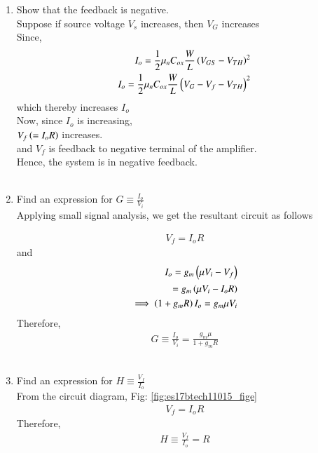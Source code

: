 \begin{enumerate}[label=\arabic*.,ref=\theenumi]
\item Show that the feedback is negative.\\
\solution 
Suppose if source voltage $V_s$ increases, then $V_G$ increases\\
Since,\\
\begin{align}
I_o = \frac{1}{2}\mu_nC_{ox}\frac{W}{L}\left(V_{GS}-V_{TH}\right)^2\\
    I_o = \frac{1}{2}\mu_nC_{ox}\frac{W}{L}\left(V_G-V_f-V_{TH}\right)^2
\end{align}
which thereby increases $I_o$\\

Now, since $I_o$ is increasing, \\
$V_f\left(=I_oR\right)$ increases.\\
and $V_f$ is feedback to negative terminal of the amplifier.\\
Hence, the system is in negative feedback.\\
\\

\item Find an expression for $G \equiv \frac{I_o}{V_i}$\\
\solution  Applying small signal analysis, we get the resultant circuit as follows 
\begin{figure}[ht!]
	\begin{center}
	    \resizebox{\columnwidth/1}{!}{}
	\end{center}
	\caption{}
	\label{fig:es17btech11015_fig2}
\end{figure}
\begin{align}
    V_f = I_oR
\end{align}
and 
\begin{align}
    I_o = g_m\left(\mu V_i-V_f\right)\\
= g_m\left(\mu V_i-I_oR\right)\\
\implies \left(1+g_mR\right)I_o = g_m\mu V_i
\end{align}
Therefore,\begin{align}
   G \equiv \frac{I_o}{V_i} = \frac{g_m\mu}{1+g_mR}
\end{align}\\

\item Find an expression for $H \equiv \frac{V_f}{I_o}$
\\
\solution 
From the circuit diagram, Fig: \ref{fig:es17btech11015_fige}
\begin{align}
    V_f = I_oR
\end{align}
Therefore,\begin{align}
    H \equiv \frac{V_f}{I_o} = R
\end{align}\\


\end{enumerate}
